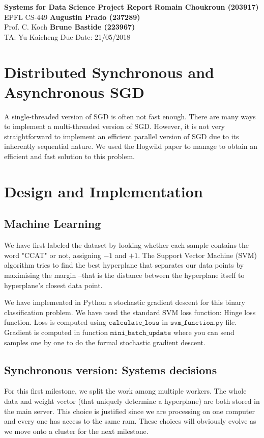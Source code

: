 \documentclass[a4paper, 11pt]{article}
\begin{document}
\noindent
\large\textbf{Systems for Data Science Project Report} \hfill  \textbf{Romain Choukroun (203917)}\\ 
\normalsize EPFL CS-449 \hfill \textbf{Augustin Prado (237289)}\\
Prof. C. Koch \hfill \textbf{Brune Bastide (223967)} \\
TA: Yu Kaicheng  \hfill Due Date: 21/05/2018

\section*{Distributed Synchronous and Asynchronous SGD
}
A single-threaded version of SGD is often not fast enough. There are many ways to implement a multi-threaded version of SGD. However, it is not very straightforward to implement an efficient parallel version of SGD due to its inherently sequential nature. We used the Hogwild paper \cite{Hogwild} to manage to obtain an efficient and fast solution to this problem.

\section*{Design and Implementation}
\subsection*{Machine Learning}
We have first labeled the dataset by looking whether each sample contains the word "CCAT" or not, assigning $-1$ and $+1$. The Support Vector Machine (SVM) algorithm tries to find the best hyperplane that separates our data points by maximising the margin --that is the distance between the hyperplane itself to hyperplane's closest data point.

We have implemented in Python a stochastic gradient descent for this binary classification problem. We have used the standard SVM loss function: Hinge loss function. Loss is computed using $\texttt{calculate\_loss}$ in $\texttt{svm\_function.py}$ file. Gradient is computed in function $\texttt{mini\_batch\_update}$ where you can send samples one by one to do the formal stochastic gradient descent.

\subsection*{Synchronous version: Systems decisions}

For this first milestone, we split the work among multiple workers. The whole data and weight vector (that uniquely determine a hyperplane) are both stored in the main server. This choice is justified since we are processing on one computer and every one has access to the same ram. These choices will obviously evolve as we move onto a cluster for the next milestone.
\end{document}
